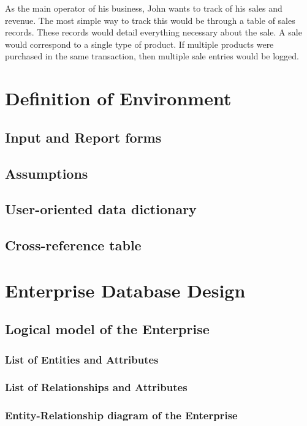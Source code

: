 \documentclass[11pt, a4paper]{report}
\begin{document}
As the main operator of his business, John wants to track of his sales and revenue. The most simple way to track this would be through a table of sales records. These records would detail everything necessary about the sale. A sale would correspond to a single type of product. If multiple products were purchased in the same transaction, then multiple sale entries would be logged.\\

\chapter{Definition of Environment}

\section{Input and Report forms}
\section{Assumptions}
\section{User-oriented data dictionary}
\section{Cross-reference table}

\chapter{Enterprise Database Design}

\section{Logical model of the Enterprise}
\subsection{List of Entities and Attributes}
\subsection{List of Relationships and Attributes}
\subsection{Entity-Relationship diagram of the Enterprise}
\end{document}
